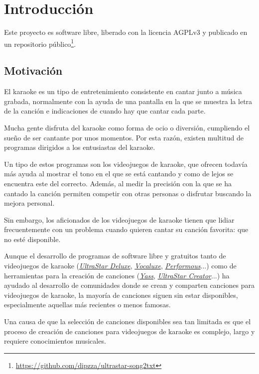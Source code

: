 \chapter{Introducción}

Este proyecto es software libre, liberado con la licencia AGPLv3 \cite{agpl} y publicado en un repositorio público\footnote{\url{https://github.com/dipzza/ultrastar-song2txt}}.

\section{Motivación}
\label{sec:motivation}

El karaoke es un tipo de entretenimiento consistente en cantar junto a música grabada, normalmente con la ayuda de una pantalla en la que se muestra la letra de la canción e indicaciones de cuando hay que cantar cada parte.

Mucha gente disfruta del karaoke como forma de ocio o diversión, cumpliendo el sueño de ser cantante por unos momentos. Por esta razón, existen multitud de programas dirigidos a los entusiastas del karaoke.

Un tipo de estos programas son los videojuegos de karaoke, que ofrecen todavía más ayuda al mostrar el tono en el que se está cantando y como de lejos se encuentra este del correcto. Además, al medir la precisión con la que se ha cantado la canción permiten competir con otras personas o disfrutar buscando la mejora personal.

Sin embargo, los aficionados de los videojuegos de karaoke tienen que lidiar frecuentemente con un problema cuando quieren cantar su canción favorita: que no esté disponible.

Aunque el desarrollo de programas de software libre y gratuitos tanto de videojuegos de karaoke (\href{https://github.com/UltraStar-Deluxe/USDX}{\textit{UltraStar Deluxe}}, \href{https://github.com/Vocaluxe/Vocaluxe}{\textit{Vocaluxe}}, \href{https://github.com/performous/performous}{\textit{Performous}}...) como de herramientas para la creación de canciones (\href{https://github.com/sarutasan72/Yass}{\textit{Yass}}, \href{https://github.com/UltraStar-Deluxe/UltraStar-Creator}{\textit{UltraStar Creator}}...) ha ayudado al desarrollo de comunidades donde se crean y comparten canciones para videojuegos de karaoke, la mayoría de canciones siguen sin estar disponibles, especialmente aquellas más recientes o menos famosas.

Una causa de que la selección de canciones disponibles sea tan limitada es que el proceso de creación de canciones para videojuegos de karaoke es complejo, largo y requiere conocimientos musicales.


